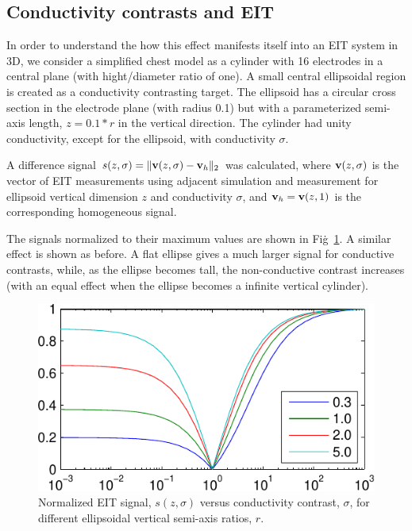 \documentclass[10pt,a4paper]{article}
\begin{document}
\begin{multicols}{2}
\section{Conductivity contrasts and EIT}

In order to understand the how this effect manifests itself into
an EIT system in 3D, we consider a simplified chest model as a cylinder
with 16 electrodes in a central plane (with hight/diameter ratio of one).
A small central ellipsoidal region is created as a conductivity contrasting
target. The ellipsoid has a circular cross section in the electrode
plane (with radius 0.1) but with a parameterized semi-axis length, 
$z= 0.1*r$ in the vertical direction. The cylinder had unity conductivity,
except for the ellipsoid, with conductivity $\sigma$.

A difference signal
 $s(z,\sigma)=\|{\bf v}(z,\sigma) - {\bf v}_h\|_2$
 was calculated, where ${\bf v}(z,\sigma)$ is the vector
of EIT measurements using adjacent simulation and measurement
for ellipsoid vertical dimension $z$ and conductivity $\sigma$,
and ${\bf v}_h = {\bf v}(z,1)$ is the corresponding homogeneous signal.

The signals normalized to their maximum values are shown in Fig\.~\ref{fig:graph}.
A similar effect is shown as before. A flat ellipse gives a much larger
signal for conductive contrasts, while, as the ellipse becomes tall, the
non-conductive contrast increases (with an equal effect when the ellipse
becomes a infinite vertical cylinder).


\begin{figure}[H]
\centering
\includegraphics[width=.96\columnwidth]{signal.pdf}
\caption{\label{fig:graph}%
Normalized EIT signal, $s(z,\sigma)$ versus conductivity contrast, $\sigma$, for
different ellipsoidal vertical semi-axis ratios, $r$.
}
\end{figure}



\end{multicols}
\end{document}
